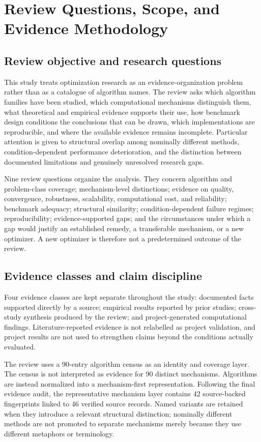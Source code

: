 \section{Review Questions, Scope, and Evidence Methodology}
\label{sec:methods}

\subsection{Review objective and research questions}

This study treats optimization research as an evidence-organization problem rather than as a catalogue of algorithm names. The review asks which algorithm families have been studied, which computational mechanisms distinguish them, what theoretical and empirical evidence supports their use, how benchmark design conditions the conclusions that can be drawn, which implementations are reproducible, and where the available evidence remains incomplete. Particular attention is given to structural overlap among nominally different methods, condition-dependent performance deterioration, and the distinction between documented limitations and genuinely unresolved research gaps.

Nine review questions organize the analysis. They concern algorithm and problem-class coverage; mechanism-level distinctions; evidence on quality, convergence, robustness, scalability, computational cost, and reliability; benchmark adequacy; structural similarity; condition-dependent failure regimes; reproducibility; evidence-supported gaps; and the circumstances under which a gap would justify an established remedy, a transferable mechanism, or a new optimizer. A new optimizer is therefore not a predetermined outcome of the review.

\subsection{Evidence classes and claim discipline}

Four evidence classes are kept separate throughout the study: documented facts supported directly by a source; empirical results reported by prior studies; cross-study synthesis produced by the review; and project-generated computational findings. Literature-reported evidence is not relabelled as project validation, and project results are not used to strengthen claims beyond the conditions actually evaluated.

The review uses a 90-entry algorithm census as an identity and coverage layer. The census is not interpreted as evidence for 90 distinct mechanisms. Algorithms are instead normalized into a mechanism-first representation. Following the final evidence audit, the representative mechanism layer contains 42 source-backed fingerprints linked to 46 verified source records. Named variants are retained when they introduce a relevant structural distinction; nominally different methods are not promoted to separate mechanisms merely because they use different metaphors or terminology.

